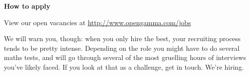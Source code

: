 \documentclass[custom, plainsections]{sciposter}
\begin{document}
\begin{multicols*}{3}
\textbf{How to apply}

View our open vacancies at \url{http://www.opengamma.com/jobs}

We will warn you, though: when you only hire the best, your recruiting process tends to be pretty intense. Depending on the role you might have to do several maths tests, and will go through several of the most gruelling hours of interviews you've likely faced. If you look at that as a challenge, get in touch. We're hiring.

\end{multicols*}
\end{document}
